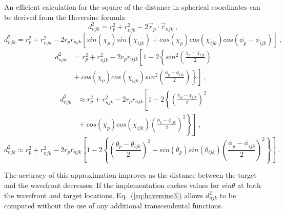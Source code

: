 \documentclass{ws-jca}
\begin{document}
An efficient calculation for the square of the distance in spherical
coordinates can be derived from the Haversine formula\cite{Sinnott1984}
\begin{equation}
	d^2_{njk} = r^2_{p} + r^2_{njk} - 2 \vec{r}_{p} \cdot \vec{r}_{njk} \:,
	\label{eq:pythagoras1}
\end{equation}
\begin{equation}
	d^2_{njk} = r^2_{p} + r^2_{njk} - 2 r_{p} r_{njk}
	\left[ sin(\chi_{p}) sin(\chi_{ijk})
	+ cos(\chi_{p}) cos(\chi_{ijk}) cos(\phi_{p}-\phi_{ijk}) \right] \:,
	\label{eq:pythagoras2}
\end{equation}
\begin{align}
	d^2_{njk} &= r^2_{p} + r^2_{njk} - 2 r_{p} r_{njk}
	\left[ 1 - 2 \left\{ sin^2 \left( \frac{\chi_{p}-\chi_{ijk}}{2} \right) 
		\right.\right.\nonumber\\
	&\left.\left. {} + cos(\chi_{p}) cos(\chi_{ijk}) sin^2 
		\left( \frac{\phi_{p}-\phi_{ijk}}{2} \right) \right\} \right] \:,
\label{eq:haversine1}
\end{align}
\begin{align}
	d^2_{njk} &\approx r^2_{p} + r^2_{njk} - 2 r_{p} r_{njk}
	\left[ 1 - 2 \left\{ \left( \frac{\chi_{p}-\chi_{ijk}}{2} \right)^2 
		\right.\right.\nonumber\\
	&\left.\left. {} + cos(\chi_{p}) cos(\chi_{ijk}) 
		\left( \frac{\phi_{p}-\phi_{ijk}}{2} \right)^2 \right\} \right] \:,
	\label{eq:haversine2}
\end{align}
\begin{equation}
	d^2_{njk} \approx r^2_{p} + r^2_{njk} - 2 r_{p} r_{njk}
	\left[ 1 - 2 \left\{ \left( \frac{\theta_{p}-\theta_{ijk}}{2} \right)^2
		+ sin(\theta_{p}) sin(\theta_{ijk}) 
		\left( \frac{\phi_{p}-\phi_{ijk}}{2} \right)^2 \right\} \right] \:.
	\label{eq:haversine3}
\end{equation}

The accuracy of this approximation improves as the distance between the
target and the wavefront decreases. If the implementation caches values for
\(sin\theta\) at both the wavefront and target locations,
Eq.~(\ref{eq:haversine3}) allows \(d^2_{njk}\) to be computed without the
use of any additional transcendental functions.
\end{document}
